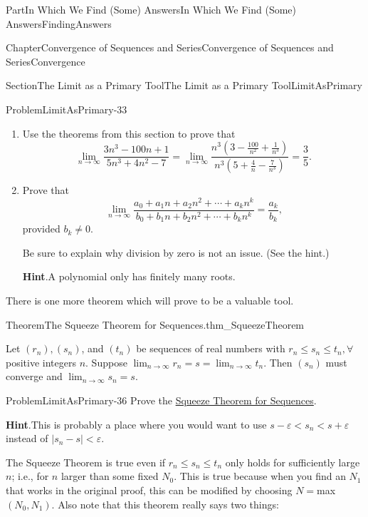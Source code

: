 \documentclass[oneside,10pt,]{book}
\newcommand{\blocktitlefont}{\relax}
\numberwithin{equation}{part}
\def\limit#1#2#3{{\displaystyle\lim_{#1\rightarrow #2}#3}}
\newcommand{\eps}{\varepsilon}
\newcommand{\lt}{<}
\begin{document}
\begin{partptx}{Part}{In Which We Find (Some) Answers}{}{In Which We Find (Some) Answers}{}{}{FindingAnswers}
\begin{chapterptx}{Chapter}{Convergence of Sequences and Series}{}{Convergence of Sequences and Series}{}{}{Convergence}
\begin{sectionptx}{Section}{The Limit as a Primary Tool}{}{The Limit as a Primary Tool}{}{}{LimitAsPrimary}
\begin{problem}{Problem}{}{LimitAsPrimary-33}
\begin{enumerate}[font=\bfseries,label=(\alph*),ref=\alph*]
\item{}Use the  theorems from this section  to prove that%
\begin{equation*}
\limit{n}{\infty}{\frac{3n^3-100n+1}{5n^3+4n^2-7}} =
\limit{n}{\infty}{\frac{n^3\left(3-\frac{100}{n^2}+\frac{1}{n^3}\right)}{n^3
\left(5+\frac{4}{n}-\frac{7}{n^3}\right)}}=\frac{3}{5}\text{.}
\end{equation*}
%
\item{}Prove that%
\begin{equation*}
\limit{n}{\infty}{\frac{a_0+a_1n+a_2n^2+
\cdots+a_kn^k}{b_0+b_1n+b_2n^2+\cdots+b_kn^k}}=\frac{a_k}{b_k}\text{,}
\end{equation*}
provided \(b_k\neq 0\).%
\par
Be sure to explain why division by zero is not an issue. (See the hint.)%
\par\smallskip%
\noindent\textbf{\blocktitlefont Hint}.\hypertarget{LimitAsPrimary-33-4-2}{}\quad{}A polynomial only has finitely many roots.%
\end{enumerate}%
\end{problem}
There is one more theorem which  will prove to be a valuable tool.%
\begin{theorem}{Theorem}{The Squeeze Theorem for Sequences.}{}{thm_SqueezeTheorem}%
%
%
\par
Let \(\left(r_n\right),\left(s_n\right)\), and \(\left(t_n\right)\) be sequences of real numbers with \(r_n\leq s_n\leq t_n,\forall\) positive integers \(n\). Suppose \(\limit{n}{\infty}{r_n}=s=\limit{n}{\infty}{t_n}\). Then \(\left(s_n\right)\) must converge and \(\limit{n}{\infty}{s_n}=s\).%
\end{theorem}
\begin{problem}{Problem}{}{LimitAsPrimary-36}%
Prove the \hyperref[thm_SqueezeTheorem]{Squeeze Theorem for Sequences}.%
\par\smallskip%
\noindent\textbf{\blocktitlefont Hint}.\hypertarget{LimitAsPrimary-36-3}{}\quad{}This is probably a place where you would want to use \(s-\eps\lt s_n\lt s+\eps\) instead of \(|s_n-s|\lt
\eps\).%
\end{problem}
The Squeeze Theorem is true even if \(r_n\leq s_n\leq
t_n\) only holds for sufficiently large \(n\); i.e., for \(n\) larger than some fixed \(N_0\).  This is true because when you find an \(N_1\) that works in the original proof, this can be modified by choosing \(N=\)max\(\left(N_0,N_1\right)\).  Also note that this theorem really says two things:%
\begin{enumerate}

\end{enumerate}
\end{sectionptx}
\end{chapterptx}
\end{partptx}
\end{document}
